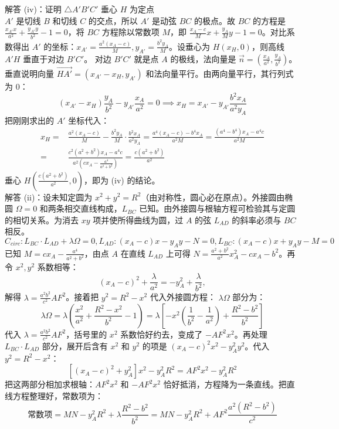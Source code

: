 \begin{solution}
解答 (iv)：证明 $\triangle A'B'C'$ 垂心 $H$ 为定点\\
$A'$ 是切线 $B$ 和切线 $C$ 的交点，所以 $A'$ 是动弦 $BC$ 的极点。故 $BC$ 的方程是 $\frac{x_{A'} x}{a^2} + \frac{y_{A'} y}{b^2} - 1 = 0$，将 $BC$ 方程除以常数项 $M$，即 $\frac{x_A - c}{M}x + \frac{y_A}{M}y - 1 = 0$。对比系数得出 $A'$ 的坐标：$x_{A'} = \frac{a^2(x_A - c)}{M}, y_{A'} = \frac{b^2 y_A}{M}$。设垂心为 $H(x_H,0)$，则高线 $A'H$ 垂直于对边 $B'C'$。
对边 $B'C'$ 就是点 $A$ 的极线，法向量是 $\vec{n} = (\frac{x_A}{a^2}, \frac{y_A}{b^2})$。
垂直说明向量 $\overrightarrow{HA'} = (x_{A'} - x_H, y_{A'})$ 和法向量平行。由两向量平行，其行列式为 0：
$$ (x_{A'} - x_H)\frac{y_A}{b^2} - y_{A'}\frac{x_A}{a^2} = 0 \implies x_H = x_{A'} - y_{A'} \frac{b^2 x_A}{a^2 y_A} $$
把刚刚求出的 $A'$ 坐标代入：
\begin{align*}
x_H =& \frac{a^2(x_A - c)}{M} - \frac{b^2 y_A}{M} \cdot \frac{b^2 x_A}{a^2 y_A} = \frac{a^4(x_A - c) - b^4 x_A}{a^2 M}=\frac{(a^4-b^4)x_A - a^4 c}{a^2 M}\\
=&\frac{c^2(a^2+b^2)x_A - a^4 c}{a^2 \left(cx_A - \frac{a^4}{a^2+b^2}\right)}=\frac{c(a^2+b^2)}{a^2}
\end{align*}
垂心 $H\left(\frac{c(a^2+b^2)}{a^2},0\right)$，即为 (iv) 的结论。\\
解答 (ii)：设未知定圆为 $x^2+y^2=R^2$（由对称性，圆心必在原点）。外接圆由椭圆 $\Omega=0$ 和两条相交直线构成，$L_{BC}$ 已知。由外接圆与根轴方程可检验其与定圆的相切关系。为消去 $xy$ 项并使所得曲线为圆，过 $A$ 的弦 $L_{AD}$ 的斜率必须与 $BC$ 相反。
\[C_{circ}: L_{BC} \cdot L_{AD} + \lambda \Omega = 0,L_{AD}: (x_A-c)x - y_A y - N = 0,L_{BC}:(x_A - c)x + y_A y - M = 0\]
已知 $M = cx_A - \frac{a^4}{a^2+b^2}$，由点 $A$ 在直线 $L_{AD}$ 上可得 $N = \frac{a^2+b^2}{a^2}x_A^2 - cx_A - b^2$。再令 $x^2,y^2$ 系数相等：
\[
(x_A-c)^2 + \frac{\lambda}{a^2} = -y_A^2 + \frac{\lambda}{b^2},
\]
解得 $\lambda = \frac{a^2 b^2}{c^2} AF^2$。接着把 $y^2 = R^2 - x^2$ 代入外接圆方程：
$\lambda \Omega$ 部分为：
$$ \lambda \Omega = \lambda \left( \frac{x^2}{a^2} + \frac{R^2-x^2}{b^2} - 1 \right) = \lambda \left[ -x^2\left(\frac{1}{b^2}-\frac{1}{a^2}\right) + \frac{R^2-b^2}{b^2} \right] $$
代入 $\lambda = \frac{a^2 b^2}{c^2} AF^2$，括号里的 $x^2$ 系数恰好约去，变成了 $-AF^2 x^2$。再处理 $L_{BC} \cdot L_{AD}$ 部分，展开后含有 $x^2$ 和 $y^2$ 的项是 $(x_A-c)^2 x^2 - y_A^2 y^2$。代入 $y^2 = R^2 - x^2$：
$$ \left[(x_A-c)^2 + y_A^2\right]x^2 - y_A^2 R^2 = AF^2 x^2 - y_A^2 R^2 $$
把这两部分相加求根轴：$AF^2 x^2$ 和 $-AF^2 x^2$ 恰好抵消，方程降为一条直线。把直线方程整理好，常数项为：
$$ \text{常数项} = MN - y_A^2 R^2 + \lambda \frac{R^2-b^2}{b^2} = MN - y_A^2 R^2 + AF^2 \frac{a^2(R^2-b^2)}{c^2} $$

\end{solution}
